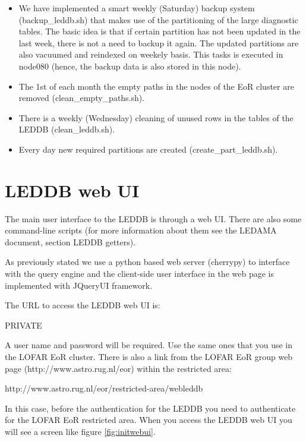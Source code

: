 \documentclass[a4paper,11pt]{article}
\begin{document}
\begin{itemize}
	\item We have implemented a smart weekly (Saturday) backup system (backup\_leddb.sh) that makes use of the partitioning of the large diagnostic tables. The basic idea is that if certain partition has not been updated in the last week, there is not a need to backup it again. The updated partitions are also vacuumed and reindexed on weekely basis. This tasks is executed in node080 (hence, the backup data is also stored in this node).
	
	\item The 1st of each month the empty paths in the nodes of the EoR cluster are removed (clean\_empty\_paths.sh).
	
	\item There is a weekly (Wednesday) cleaning of unused rows in the tables of the LEDDB (clean\_leddb.sh).
	
	\item Every day new required partitions are created (create\_part\_leddb.sh).
\end{itemize}

\section{LEDDB web UI}

The main user interface to the LEDDB is through a web UI. There are also some command-line scripts (for more information about them see the LEDAMA document, section LEDDB getters).

As previously stated we use a python based web server (cherrypy) to interface with the query engine and the client-side user interface in the web page is implemented with JQueryUI framework. 

The URL to access the LEDDB web UI is:

\begin{center}PRIVATE\end{center}

\noindent A user name and password will be required. Use the same ones that you use in the LOFAR EoR cluster. There is also a link from the LOFAR EoR group web page (http://www.astro.rug.nl/eor) within the restricted area:

\begin{center}http://www.astro.rug.nl/eor/restricted-area/webleddb\end{center}

\noindent In this case, before the authentication for the LEDDB you need to authenticate for the LOFAR EoR restricted area. When you access the LEDDB web UI you will see a screen like figure \ref{fig:initwebui}.
\end{document}
